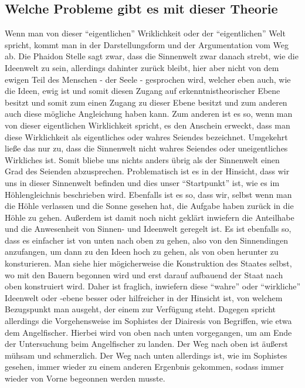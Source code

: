 \documentclass[12pt]{article}
\begin{document}
\subsection{Welche Probleme gibt es mit dieser Theorie}
Wenn man von dieser \enquote{eigentlichen} Wriklichkeit oder der \enquote{eigentlichen} Welt spricht, kommt man in der Darstellungsform und der Argumentation vom Weg ab. Die Phaidon Stelle sagt zwar, dass die Sinnenwelt zwar danach strebt, wie die Ideenwelt zu sein, allerdings dahinter zurück bleibt, hier aber nicht von dem ewigen Teil des Menschen - der Seele - gesprochen wird, welcher eben auch, wie die Ideen, ewig ist und somit diesen Zugang auf erkenntnistheorischer Ebene besitzt und somit zum einen Zugang zu dieser Ebene besitzt und zum anderen auch diese mögliche Angleichung haben kann. 
Zum anderen ist es so, wenn man von dieser eigentlichen Wirklichkeit spricht, es den Anschein erweckt, dass man diese Wirklichkeit als eigentliches oder wahres Seiendes bezeichnet. Umgekehrt ließe das nur zu, dass die Sinnenwelt nicht wahres Seiendes oder uneigentliches Wirkliches ist. Somit bliebe uns nichts anders übrig als der Sinnenwelt einen Grad des Seienden abzusprechen. Problematisch ist es in der Hinsicht, dass wir uns in dieser Sinnenwelt befinden und dies unser \enquote{Startpunkt} ist, wie es im Höhlengleichnis beschrieben wird. Ebenfalls ist es so, dass wir, selbst wenn man die Höhle verlassen und die Sonne gesehen hat, die Aufgabe haben zurück in die Höhle zu gehen.
Außerdem ist damit noch nicht geklärt inwiefern die Anteilhabe und die Anwesenheit von Sinnen- und Ideenwelt geregelt ist.
Es ist ebenfalls so, dass es einfacher ist von unten nach oben zu gehen, also von den Sinnendingen anzufangen, um dann zu den Ideen hoch zu gehen, als von oben herunter zu konsturieren. Man siehe hier mögicherweise die Konstruktion des Staates selbst, wo mit den Bauern begonnen wird und erst darauf aufbauend der Staat nach oben konstruiert wird. Daher ist fraglich, inwiefern diese \enquote{wahre} oder \enquote{wirkliche} Ideenwelt oder -ebene besser oder hilfreicher in der Hinsicht ist, von welchem Bezugspunkt man ausgeht, der einem zur Verfügung steht. Dagegen spricht allerdings die Vorgehensweise im Sophistes der Diairesis von Begriffen, wie etwa dem Angelfischer. Hierbei wird von oben nach unten vorgegangen, um am Ende der Untersuchung beim Angelfischer zu landen. Der Weg nach oben ist äußerst mühsam und schmerzlich. Der Weg nach unten allerdings ist, wie im Sophistes gesehen, immer wieder zu einem anderen Ergenbnis gekommen, sodass immer wieder von Vorne begeonnen werden musste.
\end{document}
